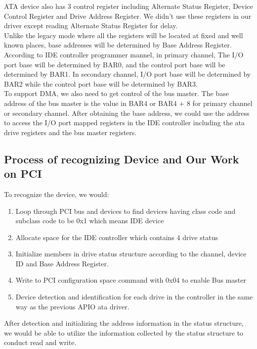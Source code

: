 \documentclass[11pt]{article}
\begin{document}
ATA device also has 3 control register including Alternate Status Register, Device Control Register and Drive Address Register. We didn't use these registers in our driver except reading Alternate Status Register for delay.\\


Unlike the legacy mode where all the registers will be located at fixed and well known places, base addresses will be determined by Base Address Register. According to IDE controller programmer mannel\cite{IDE}, in primary channel, The I/O port base will be determined by BAR0, and the control port base will be determined by BAR1. In secondary channel, I/O port base will be determined by BAR2 while the control port base will be determined by BAR3.\\

To support DMA, we also need to get control of the bus master. The base address of the bus master is the value in BAR4 or BAR4 + 8 for primary channel or secondary channel. After obtaining the base address, we could use the address to access the I/O port mapped registers in the IDE controller including the ata drive registers and the bus master registers.\\

\subsection{Process of recognizing Device and Our Work on PCI}

To recognize the device, we would:
\begin{enumerate}
    \item Loop through PCI bus and devices to find devices having class code and subclass code to be 0x1 which means IDE device
    
    \item Allocate space for the IDE controller which contains 4 drive status
    \item Initialize members in drive status structure according to the channel, device ID and Base Address Register.
    \item Write to PCI configuration space command with 0x04 to enable Bus master
    \item Device detection and identification for each drive in the controller in the same way as the previous APIO ata driver.

\end{enumerate}

After detection and initializing the address information in the status structure, we would be able to utilize the information collected by the status structure to conduct read and write.\\
\end{document}
